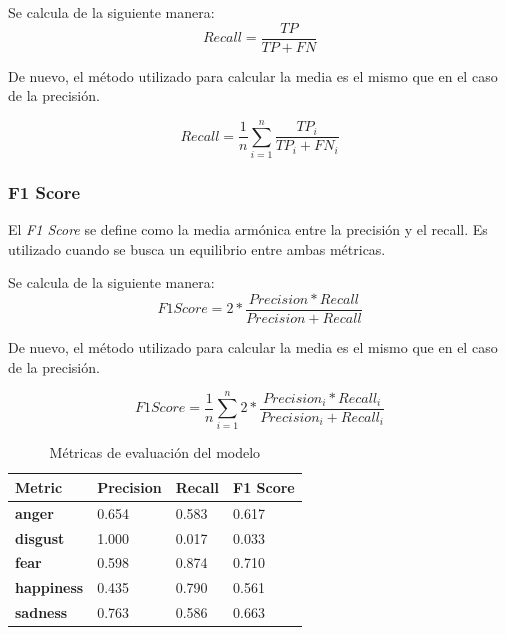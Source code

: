 Se calcula de la siguiente manera:
\begin{equation}
    Recall = \frac{TP}{TP + FN}
\end{equation}

De nuevo, el método utilizado para calcular la media es el mismo que en el caso de la precisión.

\begin{equation}
    Recall = \frac{1}{n} \sum_{i=1}^{n} \frac{TP_i}{TP_i + FN_i}
\end{equation}

\subsubsection{F1 Score}\label{seccion:f1-score}
El \textit{F1 Score} se define como la media armónica entre la precisión y el recall.
Es utilizado cuando se busca un equilibrio entre ambas métricas.

Se calcula de la siguiente manera:
\begin{equation}
    F1 Score = 2 * \frac{Precision * Recall}{Precision + Recall}
\end{equation}

De nuevo, el método utilizado para calcular la media es el mismo que en el caso de la precisión.

\begin{equation}
    F1 Score = \frac{1}{n} \sum_{i=1}^{n} 2 * \frac{Precision_i * Recall_i}{Precision_i + Recall_i}
\end{equation}




\begin{table}[htpb]
    \centering
    \begin{tabular}{|l|l|l|l|}
        \hline
        \textbf{Metric} & \textbf{Precision} & \textbf{Recall} & \textbf{F1 Score} \\ \hline
        \textbf{anger} & 0.654 & 0.583 & 0.617 \\ \hline
        \textbf{disgust} & 1.000 & 0.017 & 0.033 \\ \hline
        \textbf{fear} & 0.598 & 0.874 & 0.710 \\ \hline
        \textbf{happiness} & 0.435 & 0.790 & 0.561 \\ \hline
        \textbf{sadness} & 0.763 & 0.586 & 0.663 \\ \hline
    \end{tabular}
    \caption{Métricas de evaluación del modelo}
    \label{tab:model-metrics}
\end{table}


